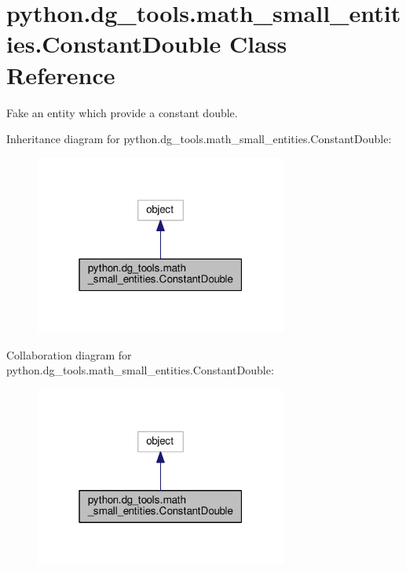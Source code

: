 \hypertarget{classpython_1_1dg__tools_1_1math__small__entities_1_1ConstantDouble}{}\section{python.\+dg\+\_\+tools.\+math\+\_\+small\+\_\+entities.\+Constant\+Double Class Reference}
\label{classpython_1_1dg__tools_1_1math__small__entities_1_1ConstantDouble}


Fake an entity which provide a constant double.  




Inheritance diagram for python.\+dg\+\_\+tools.\+math\+\_\+small\+\_\+entities.\+Constant\+Double\+:
\nopagebreak
\begin{figure}[H]
\begin{center}
\leavevmode
\includegraphics[width=235pt]{classpython_1_1dg__tools_1_1math__small__entities_1_1ConstantDouble__inherit__graph}
\end{center}
\end{figure}


Collaboration diagram for python.\+dg\+\_\+tools.\+math\+\_\+small\+\_\+entities.\+Constant\+Double\+:
\nopagebreak
\begin{figure}[H]
\begin{center}
\leavevmode
\includegraphics[width=235pt]{classpython_1_1dg__tools_1_1math__small__entities_1_1ConstantDouble__coll__graph}
\end{center}
\end{figure}
